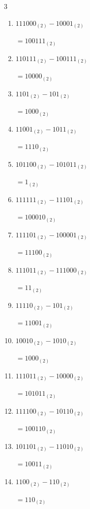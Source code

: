 \begin{multicols}{3}
\begin{enumerate}
  \item $111000_{(2)} - 10001_{(2)}$

        $=100111_{(2)}$

  \item $110111_{(2)} - 100111_{(2)}$

        $=10000_{(2)}$

  \item $1101_{(2)} - 101_{(2)}$

        $=1000_{(2)}$

  \item $11001_{(2)} - 1011_{(2)}$

        $=1110_{(2)}$

\columnbreak %

\resetques

  \item $101100_{(2)} - 101011_{(2)}$

        $=1_{(2)}$

  \item $111111_{(2)} - 11101_{(2)}$

        $=100010_{(2)}$

  \item $111101_{(2)} - 100001_{(2)}$

        $=11100_{(2)}$

  \item $111011_{(2)} - 111000_{(2)}$

        $=11_{(2)}$

  \item $11110_{(2)} - 101_{(2)}$

        $=11001_{(2)}$

  \item $10010_{(2)} - 1010_{(2)}$

        $=1000_{(2)}$

  \item $111011_{(2)} - 10000_{(2)}$

        $=101011_{(2)}$

  \item $111100_{(2)} - 10110_{(2)}$

        $=100110_{(2)}$

  \item $101101_{(2)} - 11010_{(2)}$

        $=10011_{(2)}$

  \item $1100_{(2)} - 110_{(2)}$

        $=110_{(2)}$


\end{enumerate}
\end{multicols}
